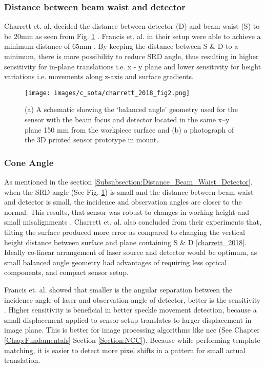     \subsubsection*{Distance between beam waist and detector}\label{Subsubsection:Distance_Beam_Waist_Detector}
    Charrett et. al. decided the distance between detector (D) and beam waist (S) to be 20mm as seen from Fig. \ref{fig:charrett_2018_fig2} \cite{charrett_2018}. Francis et. al. in their setup were able to achieve a minimum distance of 65mm \cite{francis_autonomous}. By keeping the distance between S \& D to a minimum, there is more possibility to reduce SRD angle, thus resulting in higher sensitivity for in-plane translations i.e. x - y plane and lower sensitivity for height variations i.e. movements along z-axis and surface gradients.

    \begin{figure}[h]
        \centering
        \texttt{[image: images/c\_sota/charrett\_2018\_fig2.png]}
        \caption{(a) A schematic showing the ‘balanced angle’ geometry used for the sensor with the beam focus and detector located in the same x–y plane 150 mm from the workpiece surface and (b) a photograph of the 3D printed sensor prototype in mount. \cite{charrett_2018}}
        \label{fig:charrett_2018_fig2}
    \end{figure}


    \subsubsection*{Cone Angle}
    As mentioned in the section \ref{Subsubsection:Distance_Beam_Waist_Detector}, when the SRD angle (See Fig. \ref{fig:charrett_2018_fig2}) is small and the distance between beam waist and detector is small, the incidence and observation angles are closer to the normal. This results, that sensor was robust to changes in working height and small misalignments \cite{charrett_2018}. Charrett et. al. also concluded from their experiments that, tilting the surface produced more error as compared to changing the vertical height distance between surface and plane containing S \& D \ref{charrett_2018}. Ideally co-linear arrangement of laser source and detector would be optimum, as small balanced angle geometry had advantages of requiring less optical components, and compact sensor setup.
    
    \vspace{5mm}

    \noindent Francis et. al. showed that smaller is the angular separation between the incidence angle of laser and observation angle of detector, better is the sensitivity \cite{francis_autonomous}. Higher sensitivity is beneficial in better speckle movement detection, because a small displacement applied to sensor setup translates to larger displacement in image plane. This is better for image processing algorithms like \gls{ncc} (See Chapter \ref{Chap:Fundamentals} Section \ref{Section:NCC}). Because while performing template matching, it is easier to detect more pixel shifts in a pattern for small actual translation.
    
